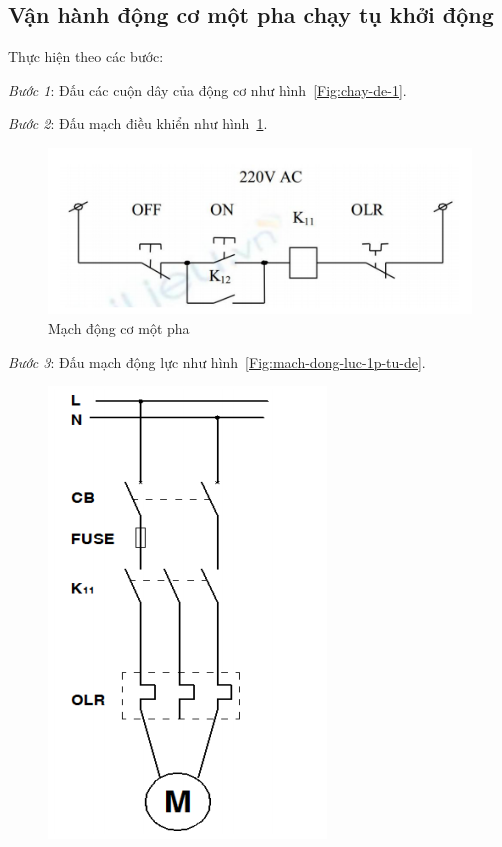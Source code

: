 \documentclass[13pt,a4paper]{extarticle}
\begin{document}
\subsection{Vận hành động cơ một pha chạy tụ khởi động}
Thực hiện theo các bước:
\begin{list}{--}{}
\item \textit{Bước 1}: Đấu các cuộn dây của động cơ như hình~\ref{Fig:chay-de-1}.
\item \textit{Bước 2}: Đấu mạch điều khiển như hình~\ref{Fig:mach-dieu-khien-1p-tu-de}.
\begin{figure}[!h]
\begin{center}
\includegraphics[scale=.6]{van-hanh-1p-tu-de-1}
\end{center}
\caption{Mạch động cơ một pha}\label{Fig:mach-dieu-khien-1p-tu-de}
\end{figure}
\item \textit{Bước 3}: Đấu mạch động lực như hình~\ref{Fig:mach-dong-luc-1p-tu-de}.
\begin{figure}[!h]
\begin{center}
\includegraphics[scale=.6]{van-hanh-1p-tu-de}

\end{center}
\end{figure}
\end{list}
\end{document}
